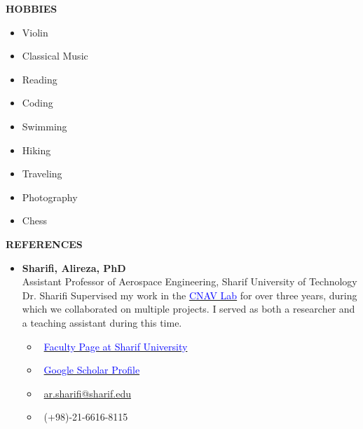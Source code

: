 \documentclass[12pt]{article}
\begin{document}
\begin{center}
	{\noindent \bfseries HOBBIES}
\end{center}
\begin{multicols}{3}
\begin{itemize} \itemsep -4pt
    \item Violin \faMusic
    \item Classical Music  \faHeadphones
    \item Reading  \faBook
    \item Coding  \faLaptopCode
    \item Swimming \faSwimmer
    \item Hiking \faMountain
    \item Traveling \faPlane
    \item Photography \faCamera
    \item Chess \faChess
\end{itemize}
\end{multicols}



\vspace{0.2in} %



\begin{center}
	{\noindent \bfseries REFERENCES}
\end{center}
\begin{itemize}
	\item \textbf{Sharifi, Alireza, PhD} \\
	Assistant Professor of Aerospace Engineering, Sharif University of Technology \\
Dr. Sharifi Supervised my work in the \href{https://www.linkedin.com/company/cnav-lab/}{\textcolor{blue}{CNAV Lab}} for over three years, during which we collaborated on multiple projects.
I served as both a researcher and a teaching assistant during this time.
	\begin{multicols}{2}
		\begin{itemize}
			\item \faGlobe \ \href{https://ae.sharif.edu/~portal/faculty/1730782165}{\textcolor{blue}{Faculty Page at Sharif University}}
			\item \faGraduationCap \ \href{https://scholar.google.com/citations?user=k_OdlNMAAAAJ&hl=en}{\textcolor{blue}{Google Scholar Profile}}
			\item \faEnvelope \ \href{mailto:ar.sharifi@sharif.edu}{ar.sharifi@sharif.edu}
			\item \faPhone \ (+98)-21-6616-8115
		\end{itemize}
\end{multicols}
\end{itemize}
\end{document}
